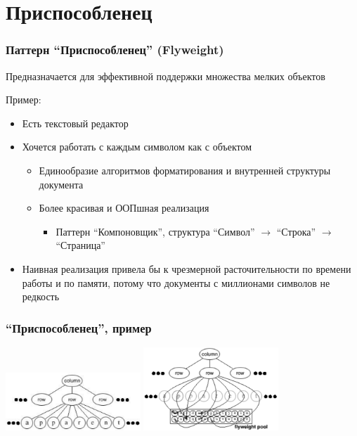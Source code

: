 \documentclass[xetex,mathserif,serif]{beamer}
\begin{document}
    \section{Приспособленец}

    \begin{frame}
        \frametitle{Паттерн ``Приспособленец'' (Flyweight)}
        Предназначается для эффективной поддержки множества мелких объектов

        Пример:

        \begin{itemize}
            \item Есть текстовый редактор
            \item Хочется работать с каждым символом как с объектом
            \begin{itemize}
                \item Единообразие алгоритмов форматирования и внутренней структуры документа
                \item Более красивая и ООПшная реализация
                \begin{itemize}
                    \item Паттерн ``Компоновщик'', структура ``Символ'' $\rightarrow$ ``Строка'' $\rightarrow$ ``Страница''
                \end{itemize}
            \end{itemize}
            \item Наивная реализация привела бы к чрезмерной расточительности по времени работы и по памяти, потому что документы с миллионами символов не редкость
        \end{itemize}
    \end{frame}

    \begin{frame}
        \frametitle{``Приспособленец'', пример}
        \begin{center}
            \includegraphics[width=0.38\textwidth]{noFlyweight.png}
            \raisebox{0.1\textheight}{\quad\Huge{$\rightarrow$}\quad}
            \includegraphics[width=0.38\textwidth]{flyweightExample.png}
        \end{center}
    \end{frame}
\end{document}
